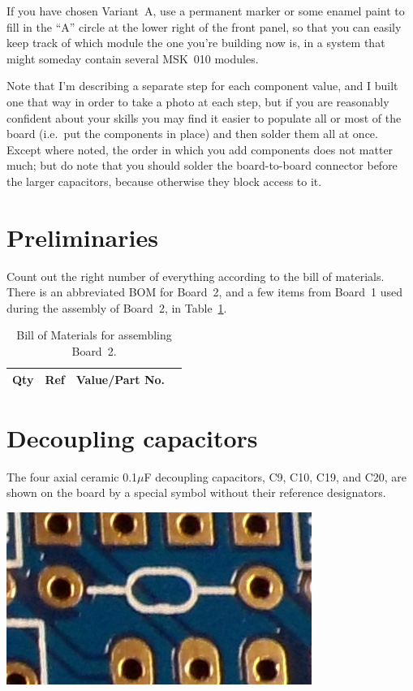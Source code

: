 If you have chosen Variant~A, use a permanent marker or some enamel paint to
fill in the ``A'' circle at the lower right of the front panel, so that you
can easily keep track of which module the one you're building now is, in a
system that might someday contain several MSK~010 modules.

Note that I'm describing a separate step for each component value,
and I built one that way in order to take a photo at each step, but if you
are reasonably confident about your skills you may find it easier to
populate all or most of the board (i.e.\ put the components in place) and
then solder them all at once.  Except where noted, the order in which you
add components does not matter much; but do note that you should solder the
board-to-board connector before the larger capacitors, because otherwise
they block access to it.

\section{Preliminaries}

Count out the right number of everything according to the bill of materials. 
There is an abbreviated BOM for Board~2, and a few items from Board~1 used
during the assembly of Board~2, in Table~\ref{tab:b2bom}.

\begin{table}
{\centering
{}
\vspace{\baselineskip}

\begin{tabular}{rp{1in}cp{3in}}
  \textbf{Qty} & \textbf{Ref} & \textbf{Value/Part No.} & \\ \hline

\end{tabular}\par}
\caption{Bill of Materials for assembling Board~2.}\label{tab:b2bom}
\end{table}

\section{Decoupling capacitors}

The four axial ceramic 0.1$\mu$F decoupling capacitors, C9, C10, C19, and
C20, are shown on the board by a special symbol without their reference
designators.

\noindent\includegraphics[width=\linewidth]{decoup-symbol.jpg}

